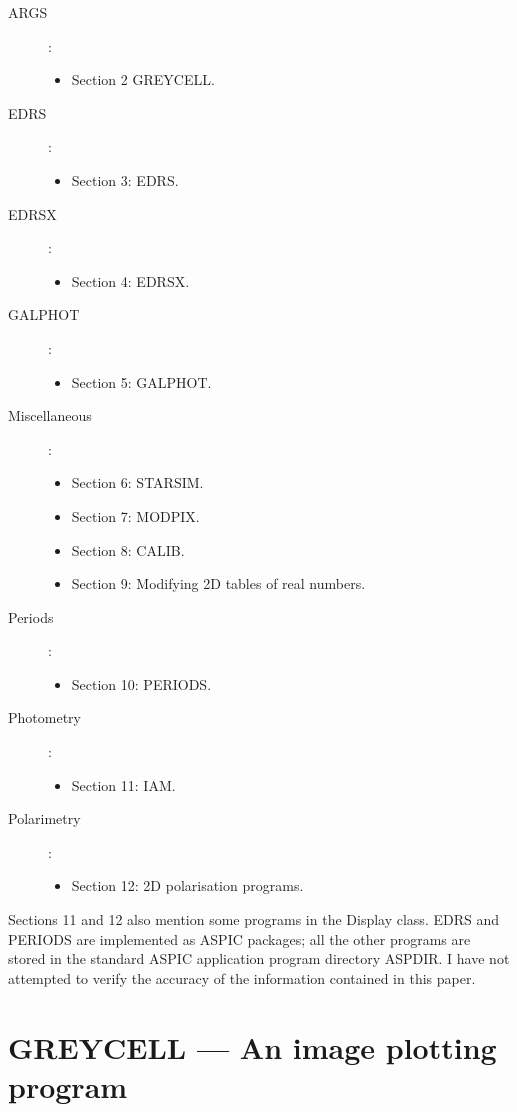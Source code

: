 \begin{description}
\item [ARGS]:
\begin{itemize}
\item Section 2 GREYCELL.
\end{itemize}
\item [EDRS]:
\begin{itemize}
\item Section 3: EDRS.
\end{itemize}
\item [EDRSX]:
\begin{itemize}
\item Section 4: EDRSX.
\end{itemize}
\item [GALPHOT]:
\begin{itemize}
\item Section 5: GALPHOT.
\end{itemize}
\item [Miscellaneous]:
\begin{itemize}
\item Section 6: STARSIM.
\item Section 7: MODPIX.
\item Section 8: CALIB.
\item Section 9: Modifying 2D tables of real numbers.
\end{itemize}
\item [Periods]:
\begin{itemize}
\item Section 10: PERIODS.
\end{itemize}
\item [Photometry]:
\begin{itemize}
\item Section 11: IAM.
\end{itemize}
\item [Polarimetry]:
\begin{itemize}
\item Section 12: 2D polarisation programs.
\end{itemize}
\end{description}
Sections 11 and 12 also mention some programs in the Display class.
EDRS and PERIODS are implemented as ASPIC packages; all the other programs
are stored in the standard ASPIC application program directory ASPDIR.
I have not attempted to verify the accuracy of the information contained in this
paper.

\section {GREYCELL --- An image plotting program}


